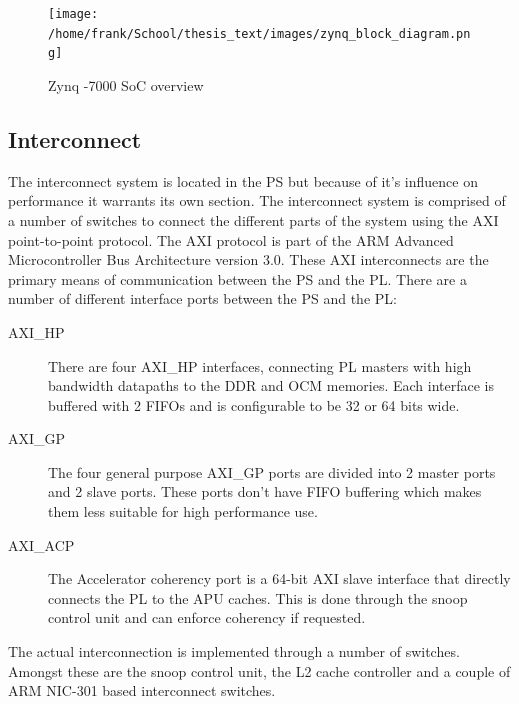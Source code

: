 \begin{figure}[H]
\centering
\texttt{[image: /home/frank/School/thesis\_text/images/zynq\_block\_diagram.png]}
\caption{Zynq -7000 SoC overview \cite{anon._zynq-7000_2013}}
\label{img:zynq_overview}
\end{figure}

	\subsection{Interconnect}
	The interconnect system is located in the PS but because of it's influence on performance it warrants its own section. The interconnect system is comprised of a number of switches to connect the different parts of the system using the AXI point-to-point protocol. The AXI protocol is part of the ARM Advanced Microcontroller Bus Architecture version 3.0. These AXI interconnects are the primary means of communication between the PS and the PL. There are a number of different interface ports between the PS and the PL:

		\begin{description}
			\item[AXI\_HP] There are four AXI\_HP interfaces, connecting PL masters with high bandwidth datapaths to the DDR and OCM memories. Each interface is buffered with 2 FIFOs and is configurable to be 32 or 64 bits wide.
			\item[AXI\_GP] The four general purpose AXI\_GP ports are divided into 2 master ports and 2 slave ports. These ports don't have FIFO buffering which makes them less suitable for high performance use. 
			\item[AXI\_ACP] The Accelerator coherency port is a 64-bit AXI slave interface that directly connects the PL to the APU caches. This is done through the snoop control unit and can enforce coherency if requested. 
		\end{description}

	The actual interconnection is implemented through a number of switches. Amongst these are the snoop control unit, the L2 cache controller and a couple of ARM NIC-301 based interconnect switches.

